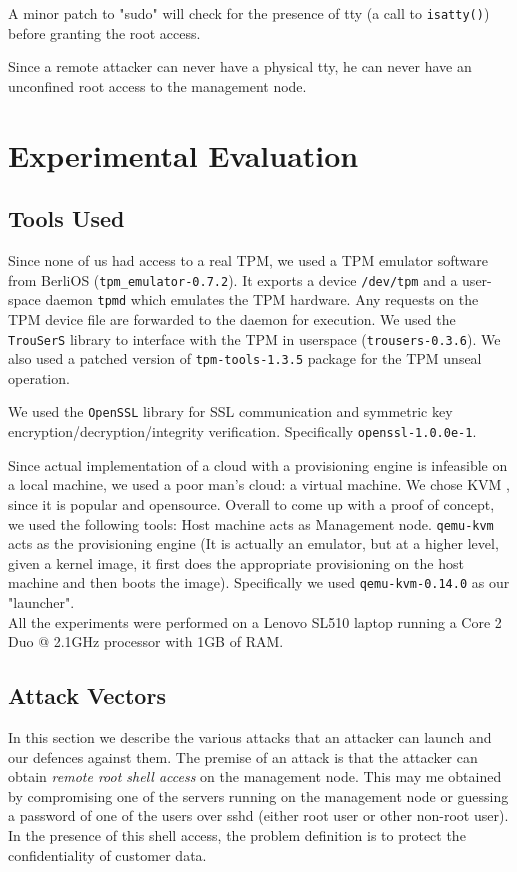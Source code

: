 \documentclass[10pt,twocolumn,pdftex]{article}
\begin{document}
A minor patch to "sudo" will check for the presence of tty (a call to {\tt isatty()}) before granting the root access. 

Since a remote attacker can never have a physical tty, he can never have an unconfined root access to the management node.

\section{Experimental Evaluation}
\label{sec:evaluation}

\subsection{Tools Used}
Since none of us had access to a real TPM, we used a TPM emulator software from BerliOS ({\tt tpm\_emulator-0.7.2}). It exports a device {\tt /dev/tpm} and a user-space daemon {\tt tpmd} which emulates the TPM hardware. Any requests on the TPM device file are forwarded to the daemon for execution. We used the {\tt TrouSerS} library to interface with the TPM in userspace ({\tt trousers-0.3.6}). We also used a patched version of {\tt tpm-tools-1.3.5} package for the TPM unseal operation.

We used the {\tt OpenSSL} library for SSL communication and symmetric key encryption/decryption/integrity verification. Specifically {\tt openssl-1.0.0e-1}. 

Since actual implementation of a cloud with a provisioning engine is infeasible on a local machine, we used a poor man's cloud: a virtual machine. We chose KVM \cite{KVM}, since it is popular and opensource. Overall to come up with a proof of concept, we used the following tools: Host machine acts as Management node. {\tt qemu-kvm} acts as the provisioning engine (It is actually an emulator, but at a higher level, given a kernel image, it first does the appropriate provisioning on the host machine and then boots the image). Specifically we used {\tt qemu-kvm-0.14.0} as our "launcher". \\

All the experiments were performed on a Lenovo SL510 laptop running a Core 2 Duo @ 2.1GHz processor with 1GB of RAM. 

\subsection{Attack Vectors}
In this section we describe the various attacks that an attacker can launch and our defences against them. The premise of an attack is that the attacker can obtain \emph{remote root shell access} on the management node. This may me obtained by compromising one of the servers running on the management node or guessing a password of one of the users over sshd (either root user or other non-root user). In the presence of this shell access, the problem definition is to protect the confidentiality of customer data.
\end{document}
